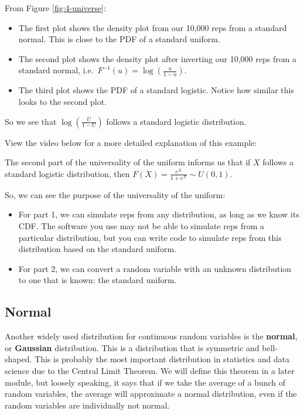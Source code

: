 \documentclass[
]{book}
\providecommand{\tightlist}{%
  \setlength{\itemsep}{0pt}\setlength{\parskip}{0pt}}
\begin{document}
From Figure \ref{fig:4-universe}:

\begin{itemize}
\tightlist
\item
  The first plot shows the density plot from our 10,000 reps from a standard normal. This is close to the PDF of a standard uniform.
\item
  The second plot shows the density plot after inverting our 10,000 reps from a standard normal, i.e.~\(F^{-1}(u) = \log (\frac{u}{1-u})\).
\item
  The third plot shows the PDF of a standard logistic. Notice how similar this looks to the second plot.
\end{itemize}

So we see that \(\log (\frac{U}{1-U})\) follows a standard logistic distribution.

View the video below for a more detailed explanation of this example:

The second part of the universality of the uniform informs us that if \(X\) follows a standard logistic distribution, then \(F(X) = \frac{e^X}{1 + e^X} \sim U(0,1)\).

So, we can see the purpose of the universality of the uniform:

\begin{itemize}
\tightlist
\item
  For part 1, we can simulate reps from any distribution, as long as we know its CDF. The software you use may not be able to simulate reps from a particular distribution, but you can write code to simulate reps from this distribution based on the standard uniform.
\item
  For part 2, we can convert a random variable with an unknown distribution to one that is known: the standard uniform.
\end{itemize}

\subsection{Normal}\label{normdist}

Another widely used distribution for continuous random variables is the \textbf{normal}, or \textbf{Gaussian} distribution. This is a distribution that is symmetric and bell-shaped. This is probably the most important distribution in statistics and data science due to the Central Limit Theorem. We will define this theorem in a later module, but loosely speaking, it says that if we take the average of a bunch of random variables, the average will approximate a normal distribution, even if the random variables are individually not normal.
\end{document}
